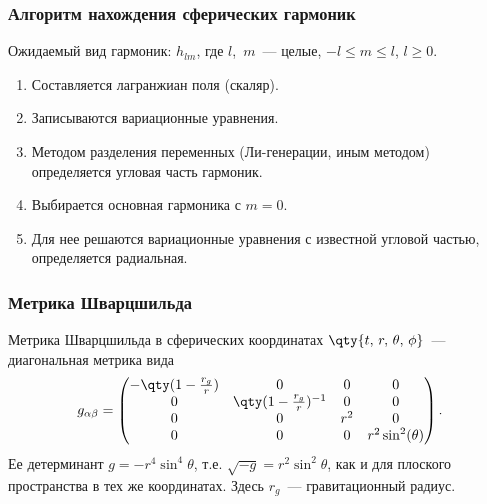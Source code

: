 \documentclass[compress, 9pt]{beamer}
\begin{document}
    \begin{frame}\frametitle{Алгоритм нахождения сферических гармоник}

        Ожидаемый вид гармоник: $h_{lm}$, где $l$,~$m$~--- целые, $-l \le m \le l$, $l \ge 0$.

        \begin{enumerate}\justifying
            \item Составляется лагранжиан поля (скаляр).
            \item Записываются вариационные уравнения.
            \item Методом разделения переменных (Ли-генерации\nocite{burlankov_space_dynamics,BurVas2019}, иным методом) определяется угловая часть гармоник.
            \item Выбирается основная гармоника с $m = 0$.
            \item Для нее решаются вариационные уравнения с известной угловой частью, определяется радиальная.
        \end{enumerate}

    \end{frame}

    \begin{frame}\frametitle{Метрика Шварцшильда}

        Метрика Шварцшильда в сферических координатах $\qty{t,\,r,\,\theta,\,\phi}$~--- диагональная метрика вида
        \begin{equation*}
            g_{\alpha\beta} = \begin{pmatrix}
                -\qty(1 - \frac{r_g}{r}) & 0 & 0 & 0 \\
                0 & \qty(1 - \frac{r_g}{r})^{-1} & 0 & 0 \\
                0 & 0 & r^2 & 0 \\
                0 & 0 & 0 & r^2 \sin^2(\theta)
            \end{pmatrix} .
        \end{equation*}
        Ее детерминант $g = -r^4 \sin^4\theta$, т.е. $\sqrt{-g} = r^2 \sin^2\theta$, как и для плоского пространства в тех же координатах. Здесь $r_g$~--- гравитационный радиус.

    \end{frame}
\end{document}
